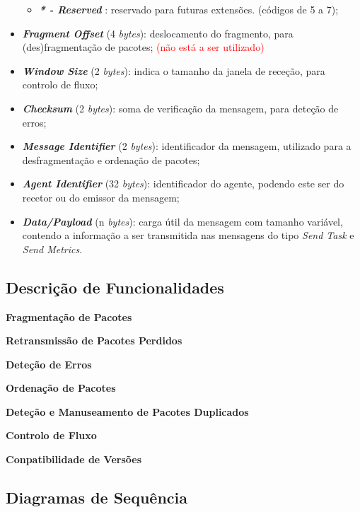\documentclass[a4paper,12pt]{scrreprt}
\begin{document}
\begin{itemize}
\begin{itemize}
            \item \textbf{\textit{* - Reserved}}                : reservado para futuras extensões. (códigos de 5 a 7);
        \end{itemize}
    \item \textbf{\textit{Fragment Offset}}    (4 \textit{bytes}): deslocamento do fragmento,
        para (des)fragmentação de pacotes; \textcolor{red}{(não está a ser utilizado)}
    \item \textbf{\textit{Window Size}}        (2 \textit{bytes}): indica o tamanho da janela de receção,
        para controlo de fluxo;
    \item \textbf{\textit{Checksum}}           (2 \textit{bytes}): soma de verificação da mensagem,
        para deteção de erros;
    \item \textbf{\textit{Message Identifier}} (2 \textit{bytes}): identificador da mensagem,
        utilizado para a desfragmentação e ordenação de pacotes;
    \item \textbf{\textit{Agent Identifier}}   (32 \textit{bytes}): identificador do agente,
        podendo este ser do recetor ou do emissor da mensagem;
    \item \textbf{\textit{Data/Payload}}       (n \textit{bytes}): carga útil da mensagem com
        tamanho variável, contendo a informação a ser transmitida nas mensagens do tipo
        \textit{Send Task} e \textit{Send Metrics}.
\end{itemize}

\subsection{Descrição de Funcionalidades}
\label{subsec:nt_desc_funcionalidades}

\textbf{Fragmentação de Pacotes}

\textbf{Retransmissão de Pacotes Perdidos}

\textbf{Deteção de Erros}

\textbf{Ordenação de Pacotes}

\textbf{Deteção e Manuseamento de Pacotes Duplicados}

\textbf{Controlo de Fluxo}

\textbf{Conpatibilidade de Versões}

\subsection{Diagramas de Sequência}
\end{document}
